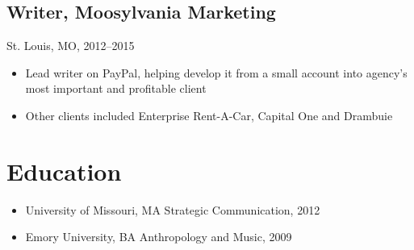 \documentclass[11pt]{article}
\begin{document}
	\subsection{\normalsize{Writer, Moosylvania Marketing}}
	{\fontsize{10pt}{\parskip}\selectfont St. Louis, MO, 2012--2015}
	\begin{itemize}
		\item Lead writer on PayPal, helping develop it from a small account into agency\rq s most important and profitable client
		\item Other clients included Enterprise Rent-A-Car, Capital One and Drambuie
	\end{itemize}
	
	\section{Education}
		\begin{itemize}
			\item University of Missouri, MA Strategic Communication, 2012
			\item Emory University, BA Anthropology and Music, 2009
					
				
		\end{itemize}
	
\end{document}
